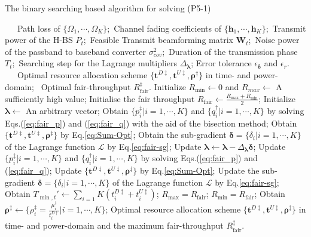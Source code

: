 \documentclass[12pt,draft,onecolumn,journal]{IEEEtran}
\begin{document}
\begin{algorithm}[!t]
	\caption{The binary searching based algorithm for solving (P5-1)}
	\footnotesize
	\begin{algorithmic}[1]
		\REQUIRE ~~\
		Path loss of $\{\Omega_1,\cdots,\Omega_K\}$;\
		Channel fading coefficients of $\{\mathbf{h}_1,\cdots,\mathbf{h}_K\}$;\
		Transmit power of the H-BS $P_{t}$;\
		Feasible Transmit beamforming matrix $\mathbf{W}_t$;\
		Noise power of the passband to baseband converter $\sigma^2_{cov}$;\
		Duration of the transmission phase $T_t$;\
		Searching step for the Lagrange multipliers $\Delta_{\boldsymbol{\lambda}}$;
		Error tolerance $\epsilon_{\boldsymbol{\delta}}$ and $\epsilon_{r}$.
		\ENSURE ~~\
		Optimal resource allocation scheme $\{\mathbf{t}^{D\ddagger}, \mathbf{t}^{U\ddagger}, \boldsymbol{\rho}^{\ddagger}\}$ in time- and power-domain; \
		Optimal fair-throughput $R_{\text{fair}}^{\ddagger}$.
		\STATE Initialize $R_{\min} \leftarrow 0$ and $R_{max} \leftarrow$ A sufficiently high value;
		\WHILE{$R_{max}-R_{min} > \epsilon_r$}
			\STATE Initialise the fair throughput $R_{\text{fair}} \leftarrow \frac{R_{\max} + R_{\min}}{2}$;
			\STATE Initialize $\boldsymbol{\lambda}\leftarrow$ An arbitrary vector;
			\STATE Obtain $\{p_i^{\ddagger} | i =1,\cdots,K\}$ and $\{q_i^{\dagger}| i=1,\cdots,K\}$ by solving Eqs.(\ref{eq:fair_p}) and (\ref{eq:fair_q}) with the aid of the bisection method;
			\STATE Obtain $\{\mathbf{t}^{D\ddagger}, \mathbf{t}^{U\ddagger}, \boldsymbol{\rho}^{\ddagger}\}$ by Eq.\eqref{eq:Sum-Opt};
			\STATE Obtain the sub-gradient $\boldsymbol{\delta} = \{\delta_i| i=1,\cdots,K\}$ of the Lagrange function $\mathcal{L}$ by Eq.\eqref{eq:fair-sg};
			\WHILE{$|\boldsymbol{\delta}| > \epsilon_{\boldsymbol{\delta}}$}
				\STATE Update $\boldsymbol{\lambda} \leftarrow \boldsymbol{\lambda} - \Delta_{\boldsymbol{\lambda}} \boldsymbol{\delta}$;
				\STATE Update $\{p_i^{\ddagger} | i =1,\cdots,K\}$ and $\{q_i^{\dagger}| i=1,\cdots,K\}$ by solving Eqs.(\ref{eq:fair_p}) and (\ref{eq:fair_q});
				\STATE Update $\{\mathbf{t}^{D\ddagger}, \mathbf{t}^{U\ddagger}, \boldsymbol{\rho}^{\ddagger}\}$ by Eq.\eqref{eq:Sum-Opt};
				\STATE Update the sub-gradient $\boldsymbol{\delta} = \{\delta_i| i=1,\cdots,K\}$ of the Lagrange function $\mathcal{L}$ by Eq.\eqref{eq:fair-sg};
			\ENDWHILE
			\STATE Obtain $T_{\min,t}' \leftarrow \sum_{i=1}{K}(t_i^{D\ddagger} + t_i^{U\ddagger})$;
			\IF{$T_{\min,t}' \leq T_{tra}$}
				\STATE $R_{\max} = R_{\text{fair}}$;
			\ELSE
				\STATE $R_{\min} = R_{\text{fair}}$;
			\ENDIF	
		\ENDWHILE
		\STATE Obtain $\boldsymbol{\rho}^{\ddagger} \leftarrow \{\rho_i^{\ddagger} = \frac{\mu_i^{\ddagger}}{t_i^{D\ddagger}} | i=1,\cdots, K\}$;
		\RETURN Optimal resource allocation scheme $\{\mathbf{t}^{D\ddagger}, \mathbf{t}^{U\ddagger}, \boldsymbol{\rho}^{\ddagger}\}$ in time- and power-domain and the maximum fair-throughput $R_{\text{fair}}^{\ddagger}$.
	\end{algorithmic}
\end{algorithm}
\end{document}
